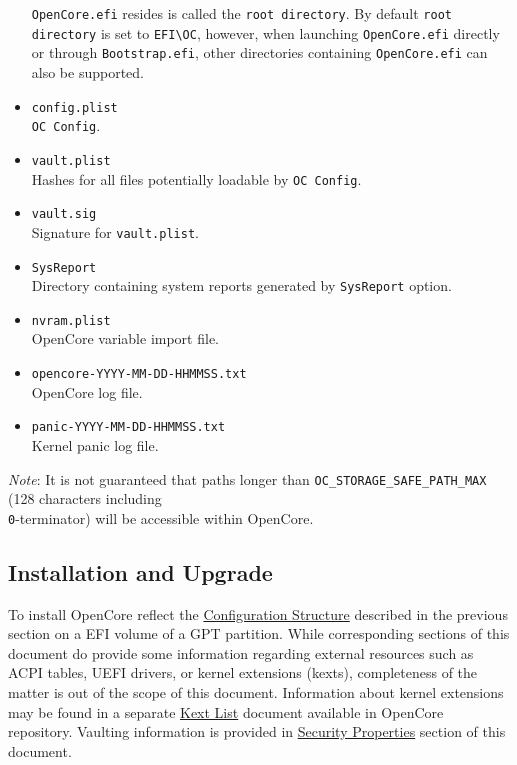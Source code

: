 \documentclass[]{article}
\begin{document}
\begin{itemize}
  \texttt{OpenCore.efi} resides is called the \texttt{root directory}.
  By default \texttt{root directory} is set to \texttt{EFI\textbackslash OC},
  however, when launching \texttt{OpenCore.efi} directly or through
  \texttt{Bootstrap.efi}, other directories containing \texttt{OpenCore.efi}
  can also be supported.
\item
  \texttt{config.plist} \\
  \texttt{OC Config}.
\item
  \texttt{vault.plist} \\
  Hashes for all files potentially loadable by \texttt{OC Config}.
\item
  \texttt{vault.sig} \\
  Signature for \texttt{vault.plist}.
\item
  \texttt{SysReport} \\
  Directory containing system reports generated by \texttt{SysReport} option.
\item
  \texttt{nvram.plist} \\
  OpenCore variable import file.
\item
  \texttt{opencore-YYYY-MM-DD-HHMMSS.txt} \\
  OpenCore log file.
\item
  \texttt{panic-YYYY-MM-DD-HHMMSS.txt} \\
  Kernel panic log file.
\end{itemize}

\emph{Note}: It is not guaranteed that paths longer than
\texttt{OC\_STORAGE\_SAFE\_PATH\_MAX} (128 characters including
\texttt{\\0}-terminator) will be accessible within OpenCore.

\subsection{Installation and Upgrade}\label{configuration-install}

To install OpenCore reflect the
\hyperref[configuration-structure]{Configuration Structure} described
in the previous section on a EFI volume of a GPT partition. While
corresponding sections of this document do provide some information
regarding external resources such as ACPI tables, UEFI drivers,
or kernel extensions (kexts), completeness of the matter is out of
the scope of this document. Information about kernel extensions may
be found in a separate
\href{https://github.com/acidanthera/OpenCorePkg/blob/master/Docs/Kexts.md}{Kext List}
document available in OpenCore repository. Vaulting information is provided in
\hyperref[miscsecurityprops]{Security Properties} section of this document.
\end{document}
